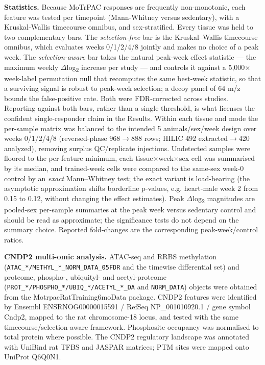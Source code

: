 \documentclass[11pt]{article}
\begin{document}
\textbf{Statistics.} Because MoTrPAC responses are frequently non-monotonic, each feature was
tested per timepoint (Mann-Whitney versus sedentary), with a Kruskal-Wallis timecourse
omnibus, and sex-stratified. Every tissue was held to two complementary bars. The \textit{selection-free} bar is the
Kruskal--Wallis timecourse omnibus, which evaluates weeks 0/1/2/4/8 jointly and makes no
choice of a peak week. The \textit{selection-aware} bar takes the natural peak-week effect
statistic --- the maximum weekly $\Delta$log\textsubscript{2} increase per study --- and controls it
against a 5,000$\times$ week-label permutation null that recomputes the same best-week statistic,
so that a surviving signal is robust to peak-week selection; a decoy panel of 64 m/z bounds the
false-positive rate. Both were FDR-corrected across studies. Reporting against both bars, rather
than a single threshold, is what licenses the confident single-responder claim in the Results. Within each tissue and mode the per-sample matrix was balanced to the intended
5 animals/sex/week design over weeks 0/1/2/4/8 (reversed-phase 968$\rightarrow$888 rows;
HILIC 492 extracted$\rightarrow$420 analyzed), removing surplus QC/replicate injections. Undetected
samples were floored to the per-feature minimum, each tissue$\times$week$\times$sex cell was summarised by
its median, and trained-week cells were compared to the same-sex week-0 control by an
\textit{exact} Mann--Whitney test; the exact variant is load-bearing (the asymptotic
approximation shifts borderline p-values, e.g. heart-male week 2 from 0.15 to 0.12, without
changing the effect estimates). Peak $\Delta$log\textsubscript{2} magnitudes are pooled-sex per-sample
summaries at the peak week versus sedentary control and should be read as approximate; the
significance tests do not depend on the summary choice. Reported fold-changes are the corresponding
peak-week/control ratios.

\textbf{CNDP2 multi-omic analysis.} ATAC-seq and RRBS methylation
(\texttt{ATAC\_*/METHYL\_*\_NORM\_DATA\_05FDR} and the timewise differential set) and proteome,
phospho-, ubiquityl- and acetyl-proteome (\texttt{PROT\_*/PHOSPHO\_*/UBIQ\_*/ACETYL\_*\_DA} and
\texttt{NORM\_DATA}) objects were obtained from the MotrpacRatTraining6moData package. CNDP2
features were identified by Ensembl ENSRNOG00000015591 / RefSeq NP\_001010920.1 / gene
symbol Cndp2, mapped to the rat chromosome-18 locus, and tested with the same
timecourse/selection-aware framework. Phosphosite occupancy was normalised to total
protein where possible. The CNDP2 regulatory landscape was annotated with UniBind rat
TFBS and JASPAR matrices; PTM sites were mapped onto UniProt Q6Q0N1.
\end{document}
